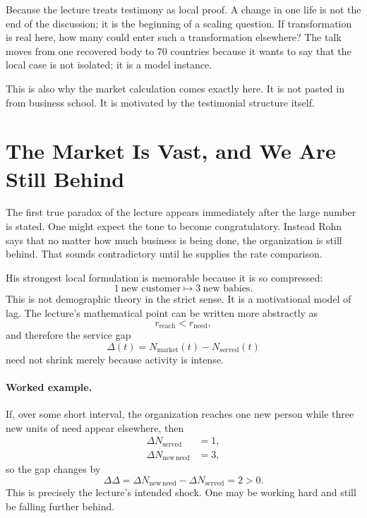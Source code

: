 Because the lecture treats testimony as local proof. A change in one life is not the end of the discussion; it is the beginning of a scaling question. If transformation is real here, how many could enter such a transformation elsewhere? The talk moves from one recovered body to 70 countries because it wants to say that the local case is not isolated; it is a model instance.

This is also why the market calculation comes exactly here. It is not pasted in from business school. It is motivated by the testimonial structure itself.

\section{The Market Is Vast, and We Are Still Behind}

The first true paradox of the lecture appears immediately after the large number is stated. One might expect the tone to become congratulatory. Instead Rohn says that no matter how much business is being done, the organization is still behind. That sounds contradictory until he supplies the rate comparison.

His strongest local formulation is memorable because it is so compressed:
\begin{equation}
1\ \text{new customer} \mapsto 3\ \text{new babies}.
\end{equation}
This is not demographic theory in the strict sense. It is a motivational model of lag. The lecture's mathematical point can be written more abstractly as
\begin{equation}
r_{\mathrm{reach}} < r_{\mathrm{need}},
\end{equation}
and therefore the service gap
\begin{equation}
\Delta(t)=N_{\mathrm{market}}(t)-N_{\mathrm{served}}(t)
\end{equation}
need not shrink merely because activity is intense.

\paragraph{Worked example.}
If, over some short interval, the organization reaches one new person while three new units of need appear elsewhere, then
\begin{align}
\Delta N_{\mathrm{served}} &= 1,\\
\Delta N_{\mathrm{new\,need}} &= 3,
\end{align}
so the gap changes by
\begin{equation}
\Delta\Delta=\Delta N_{\mathrm{new\,need}}-\Delta N_{\mathrm{served}}=2>0.
\end{equation}
This is precisely the lecture's intended shock. One may be working hard and still be falling further behind.

